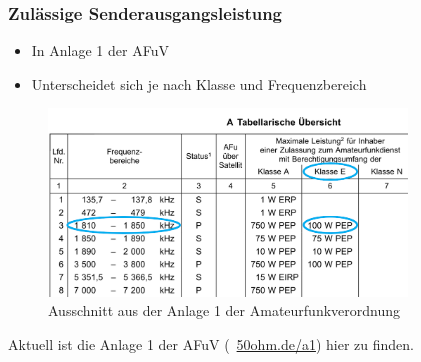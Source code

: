 \begin{frame}
\frametitle{Zulässige Senderausgangsleistung}
\begin{itemize}
  \item In Anlage 1 der AFuV
  \item Unterscheidet sich je nach Klasse und Frequenzbereich
  \end{itemize}

\end{frame}

\begin{frame}
\begin{figure}
    \includegraphics[width=0.85\textwidth]{foto/145}
    \caption{\scriptsize Ausschnitt aus der Anlage 1 der Amateurfunkverordnung}
    \label{ausgangsleistung}
\end{figure}
\end{frame}

\begin{frame}Aktuell ist die Anlage 1 der AFuV (\textcolor{DARCblue}{\faLink~\href{https://50ohm.de/a1}{50ohm.de/a1}}) hier zu finden.

\end{frame}

\begin{frame}
\end{frame}


